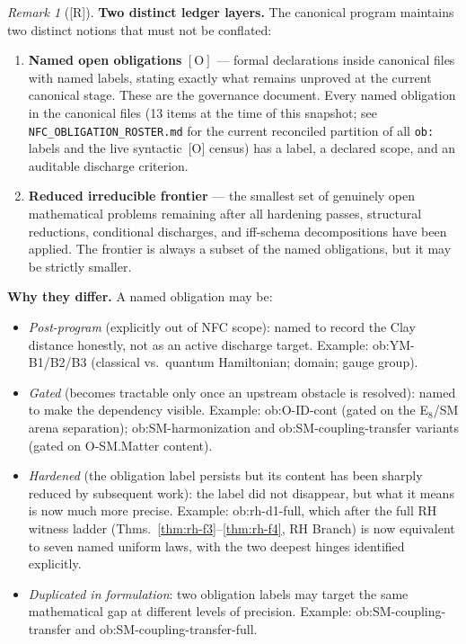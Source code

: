 \documentclass[12pt,oneside]{amsbook}
\theoremstyle{plain}
\theoremstyle{definition}
\theoremstyle{remark}
\newtheorem{remark}[theorem]{Remark}
\newcommand{\status}[1]{\textup{[#1]}}
\begin{document}
\begin{remark}[\status{R}]\label{rem:named-vs-frontier}
\textbf{Two distinct ledger layers.}
The canonical program maintains two distinct notions that must not be
conflated:

\begin{enumerate}[label=\textup{(\arabic*)}]
  \item \textbf{Named open obligations} $[\mathrm{O}]$ --- formal
    declarations inside canonical files with named labels, stating
    exactly what remains unproved at the current canonical stage.
    These are the governance document.  Every named obligation in the
    canonical files (13 items at the time of this snapshot; see
    \texttt{NFC\_OBLIGATION\_ROSTER.md} for the current reconciled
    partition of all \texttt{ob:} labels and the live syntactic~[O]
    census) has a label, a declared
    scope, and an auditable discharge criterion.

  \item \textbf{Reduced irreducible frontier} --- the smallest
    set of genuinely open mathematical problems remaining after all
    hardening passes, structural reductions, conditional discharges,
    and iff-schema decompositions have been applied.  The frontier
    is always a subset of the named obligations, but it may be
    strictly smaller.
\end{enumerate}

\textbf{Why they differ.}
A named obligation may be:
\begin{itemize}
  \item \emph{Post-program} (explicitly out of NFC scope): named
    to record the Clay distance honestly, not as an active discharge
    target.  Example: ob:YM-B1/B2/B3 (classical vs.\ quantum
    Hamiltonian; domain; gauge group).
  \item \emph{Gated} (becomes tractable only once an upstream
    obstacle is resolved): named to make the dependency visible.
    Example: ob:O-ID-cont (gated on the E$_8$/SM arena separation);
    ob:SM-harmonization and ob:SM-coupling-transfer variants (gated
    on O-SM.Matter content).
  \item \emph{Hardened} (the obligation label persists but its
    content has been sharply reduced by subsequent work): the label
    did not disappear, but what it means is now much more precise.
    Example: ob:rh-d1-full, which after the full RH witness ladder
    (Thms.~\ref{thm:rh-f3}--\ref{thm:rh-f4}, RH Branch) is now
    equivalent to seven named uniform laws, with the two deepest
    hinges identified explicitly.
  \item \emph{Duplicated in formulation}: two obligation labels
    may target the same mathematical gap at different levels of
    precision.  Example: ob:SM-coupling-transfer and
    ob:SM-coupling-transfer-full.
\end{itemize}


\end{remark}
\end{document}
